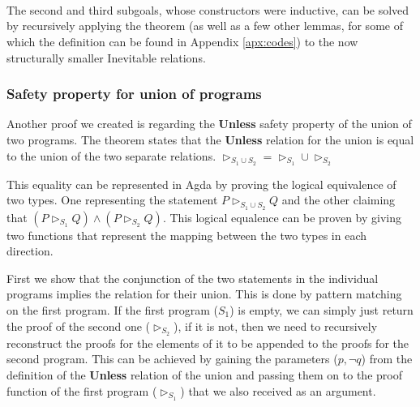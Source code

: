 \begin{code}
    \AgdaSymbol{)}\AgdaSpace{}%
    \AgdaSymbol{=}\<%
    \\
    \>[2][@{}l@{\AgdaIndent{0}}]%
    \>[4]\<%
    \\
    \>[4][@{}l@{\AgdaIndent{0}}]%
    \>[6]\AgdaSymbol{(}\AgdaSpace{}%
    \AgdaSymbol{)}\<%
    \\
    \>[6]\AgdaSymbol{(}\AgdaSpace{}%
    \AgdaSymbol{(}\AgdaSpace{}%
    \AgdaSymbol{(}\AgdaSpace{}%
    \AgdaOperator{\AgdaInductiveConstructor{,}}\AgdaSpace{}%
    \AgdaSymbol{)}\AgdaSpace{}%
    \AgdaOperator{\AgdaInductiveConstructor{,}}\AgdaSpace{}%
    \AgdaSpace{}%
    \AgdaSymbol{(}\AgdaSpace{}%
    \AgdaOperator{\AgdaInductiveConstructor{,}}\AgdaSpace{}%
    \AgdaSymbol{)))}\<%
\end{code}

The second and third subgoals, whose constructors were inductive, can be solved by recursively applying the theorem (as well as a few other lemmas, for some of which the definition can be found in Appendix \ref{apx:codes}) to the now structurally smaller Inevitable relations.

%     


\subsubsection{Safety property for union of programs}

Another proof we created is regarding the \textbf{Unless} safety property of the union of two programs. The theorem states that the \textbf{Unless} relation for the union is equal to the union of the two separate relations. $\rhd_{S_1 \cup S_2} = \rhd_{S_{1}} \cup \rhd_{S_{2}}$

This equality can be represented in Agda by proving the logical equivalence of two types. One representing the statement $P \rhd_{S_{1} \cup S_{2}} Q$ and the other claiming that $(P \rhd_{S_{1}} Q) \land (P \rhd_{S_{2}} Q)$. This logical equalence can be proven by giving two functions that represent the mapping between the two types in each direction.

First we show that the conjunction of the two statements in the individual programs implies the relation for their union. This is done by pattern matching on the first program. If the first program ($S_{1}$) is empty, we can simply just return the proof of the second one ($\rhd_{S_{2}}$), if it is not, then we need to recursively reconstruct the proofs for the elements of it to be appended to the proofs for the second program. This can be achieved by gaining the parameters ($p , \neg q$) from the definition of the \textbf{Unless} relation of the union and passing them on to the proof function of the first program ($\rhd_{S_{1}}$) that we also received as an argument.

